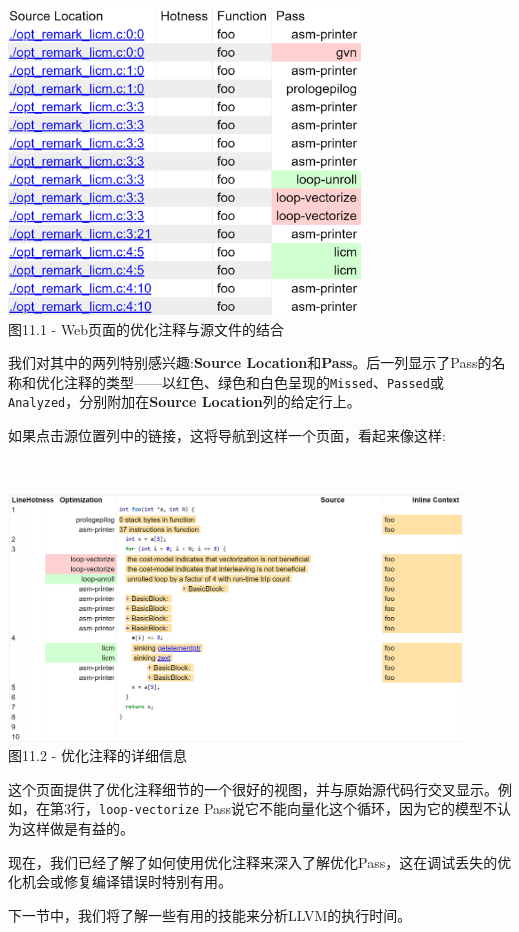 \begin{enumerate}
\hspace*{\fill} \\ %
\begin{center}
\includegraphics[width=0.7\textwidth]{content/3/chapter11/images/1.png}\\
图11.1 - Web页面的优化注释与源文件的结合
\end{center}

我们对其中的两列特别感兴趣:\textbf{Source Location}和\textbf{Pass}。后一列显示了Pass的名称和优化注释的类型——以红色、绿色和白色呈现的\texttt{Missed}、\texttt{Passed}或\texttt{Analyzed}，分别附加在\textbf{Source Location}列的给定行上。

如果点击源位置列中的链接，这将导航到这样一个页面，看起来像这样:

\hspace*{\fill} \\ %
\begin{center}
\includegraphics[width=0.9\textwidth]{content/3/chapter11/images/2.png}\\
图11.2 - 优化注释的详细信息
\end{center}

这个页面提供了优化注释细节的一个很好的视图，并与原始源代码行交叉显示。例如，在第3行，\texttt{loop-vectorize} Pass说它不能向量化这个循环，因为它的模型不认为这样做是有益的。

\end{enumerate}

现在，我们已经了解了如何使用优化注释来深入了解优化Pass，这在调试丢失的优化机会或修复编译错误时特别有用。

下一节中，我们将了解一些有用的技能来分析LLVM的执行时间。





















